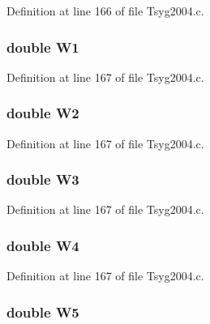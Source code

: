Definition at line 166 of file Tsyg2004.c.\hypertarget{struct___t_s04_info_34cbf6576a130ac93a6a2eeb153263b3}{
\subsubsection[{W1}]{\setlength{\rightskip}{0pt plus 5cm}double {\bf W1}}}
\label{struct___t_s04_info_34cbf6576a130ac93a6a2eeb153263b3}




Definition at line 167 of file Tsyg2004.c.\hypertarget{struct___t_s04_info_63a3207d198302df77e4bb177339f18f}{
\subsubsection[{W2}]{\setlength{\rightskip}{0pt plus 5cm}double {\bf W2}}}
\label{struct___t_s04_info_63a3207d198302df77e4bb177339f18f}




Definition at line 167 of file Tsyg2004.c.\hypertarget{struct___t_s04_info_0a5ed99cbecc8835fafcb0bcb8345e5b}{
\subsubsection[{W3}]{\setlength{\rightskip}{0pt plus 5cm}double {\bf W3}}}
\label{struct___t_s04_info_0a5ed99cbecc8835fafcb0bcb8345e5b}




Definition at line 167 of file Tsyg2004.c.\hypertarget{struct___t_s04_info_6e860cf299bef0c1ccc448ee80760947}{
\subsubsection[{W4}]{\setlength{\rightskip}{0pt plus 5cm}double {\bf W4}}}
\label{struct___t_s04_info_6e860cf299bef0c1ccc448ee80760947}




Definition at line 167 of file Tsyg2004.c.\hypertarget{struct___t_s04_info_73d56f377ea7552b6b64161fe51237f8}{
\subsubsection[{W5}]{\setlength{\rightskip}{0pt plus 5cm}double {\bf W5}}}
\label{struct___t_s04_info_73d56f377ea7552b6b64161fe51237f8}




